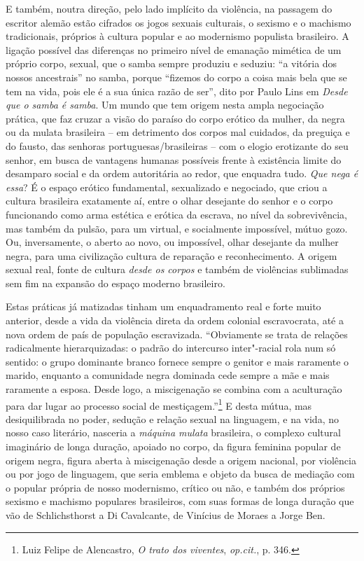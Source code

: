 E também, noutra direção, pelo lado implícito da violência, na passagem
do escritor alemão estão cifrados os jogos sexuais culturais, o sexismo
e o machismo tradicionais, próprios à cultura popular e ao modernismo
populista brasileiro. A ligação possível das diferenças no primeiro
nível de emanação mimética de um próprio corpo, sexual, que o samba
sempre produziu e seduziu: ``a vitória dos nossos ancestrais'' no samba,
porque ``fizemos do corpo a coisa mais bela que se tem na vida, pois ele
é a sua única razão de ser'', dito por Paulo Lins em \emph{Desde que o
samba é samba}. Um mundo que tem origem nesta ampla negociação prática,
que faz cruzar a visão do paraíso do corpo erótico da mulher, da negra
ou da mulata brasileira -- em detrimento dos corpos mal cuidados, da
preguiça e do fausto, das senhoras portuguesas/brasileiras -- com o
elogio erotizante do seu senhor, em busca de vantagens humanas possíveis
frente à existência limite do desamparo social e da ordem autoritária ao
redor, que enquadra tudo. \emph{Que nega é essa}? É o espaço erótico
fundamental, sexualizado e negociado, que criou a cultura brasileira
exatamente aí, entre o olhar desejante do senhor e o corpo funcionando
como arma estética e erótica da escrava, no nível da sobrevivência, mas
também da pulsão, para um virtual, e socialmente impossível, mútuo gozo.
Ou, inversamente, o aberto ao novo, ou impossível, olhar desejante da
mulher negra, para uma civilização cultura de reparação e
reconhecimento. A origem sexual real, fonte de cultura \emph{desde os
corpos} e também de violências sublimadas sem fim na expansão do espaço
moderno brasileiro.

Estas práticas já matizadas tinham um enquadramento real e forte muito
anterior, desde a vida da violência direta da ordem colonial
escravocrata, até a nova ordem de país de população escravizada.
``Obviamente se trata de relações radicalmente hierarquizadas: o padrão
do intercurso inter"-racial rola num só sentido: o grupo dominante branco
fornece sempre o genitor e mais raramente o marido, enquanto a
comunidade negra dominada cede sempre a mãe e mais raramente a esposa.
Desde logo, a miscigenação se combina com a aculturação para dar lugar
ao processo social de mestiçagem.''\footnote{Luiz Felipe de Alencastro,
  \emph{O trato dos viventes}, \emph{op.cit.}, p. 346.} E desta mútua,
mas desiquilibrada no poder, sedução e relação sexual na linguagem, e na
vida, no nosso caso literário, nasceria a \emph{máquina mulata}
brasileira, o complexo cultural imaginário de longa duração, apoiado no
corpo, da figura feminina popular de origem negra, figura aberta à
miscigenação desde a origem nacional, por violência ou por jogo de
linguagem, que seria emblema e objeto da busca de mediação com o popular
própria de nosso modernismo, crítico ou não, e também dos próprios
sexismo e machismo populares brasileiros, com suas formas de longa
duração que vão de Schlichsthorst a Di Cavalcante, de Vinícius de Moraes
a Jorge Ben.

